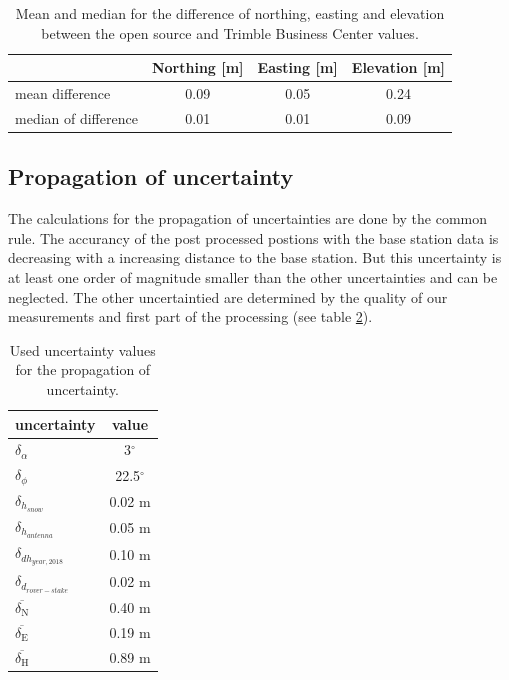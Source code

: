 \begin{table}[H]
	\caption{Mean and median for the difference of northing, easting and elevation between the open source and Trimble Business Center values.}
	\centering
	\begin{tabular}{lccc}
	\toprule         
      &  Northing [m] & Easting [m] & Elevation [m] \\
	\midrule
    mean difference &  0.09 & 0.05 & 0.24 \\
    median of difference & 0.01 & 0.01 & 0.09 \\
    \bottomrule
	\end{tabular}
	\label{GPS:tab:diff}
\end{table}

\subsection{Propagation of uncertainty}

The calculations for the propagation of uncertainties are done by the common rule.
The accurancy of the post processed postions with the base station data is decreasing with a increasing distance to the base station. 
But this uncertainty is at least one order of magnitude smaller than the other uncertainties and can be neglected. 
The other uncertaintied are determined by the quality of our measurements and first part of the processing (see table \ref{GPS:tab:errors}).

\begin{table}[H]
	\caption{Used uncertainty values for the propagation of uncertainty.}
	\centering
	\begin{tabular}{lc}
	\toprule
        uncertainty &  value \\
	\midrule
    $ \delta_{\alpha} $ &  3$^{\circ}$ \\
    $ \delta_{\phi} $ &  22.5$^{\circ}$ \\
    $ \delta_{h_{snow}}$ &  0.02 m \\
    $ \delta_{h_{antenna}} $ &  0.05 m \\
    $ \delta_{dh_{year,2018}} $ &  0.10 m \\
    $ \delta_{d_{rover-stake}} $ &  0.02 m \\
    $ \overline{\delta_{\text{N}}} $ & 0.40 m \\
    $ \overline{\delta_{\text{E}}} $ & 0.19 m \\
    $ \overline{\delta_{\text{H}}} $ & 0.89 m \\
    \bottomrule
	\end{tabular}
	\label{GPS:tab:errors}
\end{table} 

